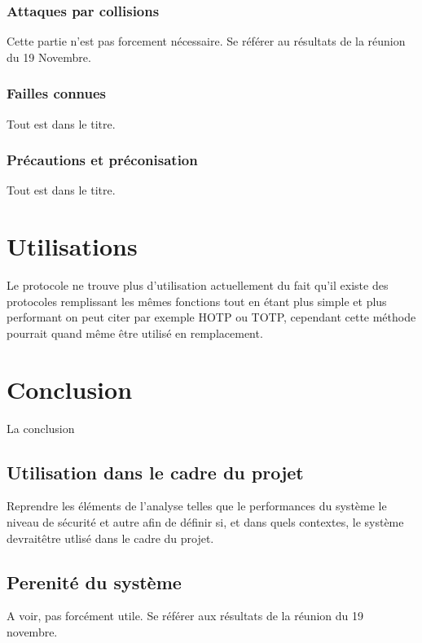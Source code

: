 \documentclass{../res/univ-projet}
\begin{document}
    \subsubsection{Attaques par collisions}
      Cette partie n'est pas forcement nécessaire. Se référer au résultats de 
la 
réunion du 19 Novembre.
    
    \subsubsection{Failles connues}
      Tout est dans le titre.
    
    \subsubsection{Précautions et préconisation}
      Tout est dans le titre.
  
\section{Utilisations}
  Le protocole ne trouve plus d'utilisation actuellement du fait qu'il existe des protocoles remplissant
  les mêmes fonctions tout en étant plus simple et plus performant on peut citer par exemple HOTP ou TOTP, cependant
  cette méthode pourrait quand même être utilisé en remplacement.
  
\section{Conclusion}
  La conclusion
  \subsection{Utilisation dans le cadre du projet}
    Reprendre les éléments de l'analyse telles que le performances du système 
le 
niveau de sécurité et autre afin de définir si, et dans quels contextes, le 
système devrait\^etre utlisé dans le cadre du projet.
  
  \subsection{Perenité du système}
    A voir, pas forcément utile. Se référer aux résultats de la réunion du 19 
novembre.
    
\end{document}
